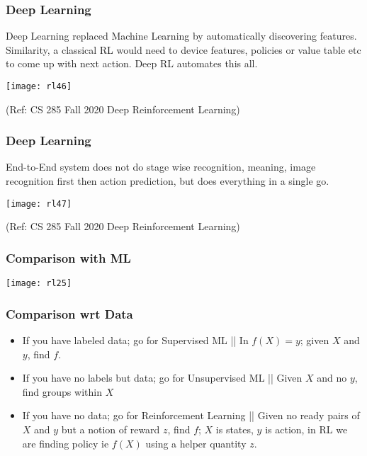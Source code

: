\begin{frame}[fragile]\frametitle{Deep Learning}

Deep Learning replaced Machine Learning by automatically discovering features. Similarity, a classical RL would need to device features, policies or value table etc to come up with next action. Deep RL automates this all.

\begin{center}
\texttt{[image: rl46]}
\end{center}


{\tiny (Ref: CS 285 Fall 2020 Deep Reinforcement Learning)}

\end{frame}


\begin{frame}[fragile]\frametitle{Deep Learning}

End-to-End system does not do stage wise recognition, meaning, image recognition first then action prediction, but does everything in a single go.

\begin{center}
\texttt{[image: rl47]}
\end{center}


{\tiny (Ref: CS 285 Fall 2020 Deep Reinforcement Learning)}

\end{frame}


\begin{frame}[fragile]\frametitle{Comparison with ML}
\begin{center}
\texttt{[image: rl25]}
\end{center}
\end{frame}

\begin{frame}[fragile]\frametitle{Comparison wrt Data}

\begin{itemize}
\item If you have labeled data; go for Supervised ML || In $f(X) = y$; given $X$ and $y$,  find $f$.
\item If you have no labels but data; go for Unsupervised ML || Given $X$ and no $y$,  find groups within $X$
\item If you have no data; go for Reinforcement Learning || Given no ready pairs of $X$ and $y$ but a notion of reward $z$, find $f$; $X$ is states, $y$ is action, in RL we are finding policy ie $f(X)$ using a helper quantity $z$.
\end{itemize}


\end{frame}


